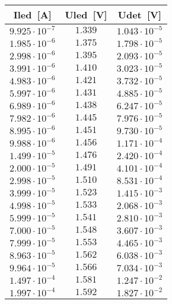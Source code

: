 
\begin{tabular}{|c|c|c|}
    \hline
    Iled~[A]	            & Uled~[V]	& Udet~[V]	 	            \\ \hline
    \(9.925\cdot10^{-7}\)	& \(1.339\)	& \(1.043\cdot10^{-5}\)	 	\\ \hline
    \(1.985\cdot10^{-6}\)	& \(1.375\)	& \(1.798\cdot10^{-5}\)	 	\\ \hline
    \(2.998\cdot10^{-6}\)	& \(1.395\)	& \(2.093\cdot10^{-5}\)	 	\\ \hline
    \(3.991\cdot10^{-6}\)	& \(1.410\)	& \(3.023\cdot10^{-5}\)	 	\\ \hline
    \(4.983\cdot10^{-6}\)	& \(1.421\)	& \(3.732\cdot10^{-5}\)	 	\\ \hline
    \(5.997\cdot10^{-6}\)	& \(1.431\)	& \(4.885\cdot10^{-5}\)	 	\\ \hline
    \(6.989\cdot10^{-6}\)	& \(1.438\)	& \(6.247\cdot10^{-5}\)	 	\\ \hline
    \(7.982\cdot10^{-6}\)	& \(1.445\)	& \(7.976\cdot10^{-5}\)	 	\\ \hline
    \(8.995\cdot10^{-6}\)	& \(1.451\)	& \(9.730\cdot10^{-5}\)	 	\\ \hline
    \(9.988\cdot10^{-6}\)	& \(1.456\)	& \(1.171\cdot10^{-4}\)	 	\\ \hline
    \(1.499\cdot10^{-5}\)	& \(1.476\)	& \(2.420\cdot10^{-4}\)	 	\\ \hline
    \(2.000\cdot10^{-5}\)	& \(1.491\)	& \(4.101\cdot10^{-4}\)	 	\\ \hline
    \(2.998\cdot10^{-5}\)	& \(1.510\)	& \(8.531\cdot10^{-4}\)	 	\\ \hline
    \(3.999\cdot10^{-5}\)	& \(1.523\)	& \(1.415\cdot10^{-3}\)	 	\\ \hline
    \(4.998\cdot10^{-5}\)	& \(1.533\)	& \(2.068\cdot10^{-3}\)	 	\\ \hline
    \(5.999\cdot10^{-5}\)	& \(1.541\)	& \(2.810\cdot10^{-3}\)	 	\\ \hline
    \(7.000\cdot10^{-5}\)	& \(1.548\)	& \(3.607\cdot10^{-3}\)	 	\\ \hline
    \(7.999\cdot10^{-5}\)	& \(1.553\)	& \(4.465\cdot10^{-3}\)	 	\\ \hline
    \(8.963\cdot10^{-5}\)	& \(1.562\)	& \(6.038\cdot10^{-3}\)	 	\\ \hline
    \(9.964\cdot10^{-5}\)	& \(1.566\)	& \(7.034\cdot10^{-3}\)	 	\\ \hline
    \(1.497\cdot10^{-4}\)	& \(1.581\)	& \(1.247\cdot10^{-2}\)	 	\\ \hline
    \(1.997\cdot10^{-4}\)	& \(1.592\)	& \(1.827\cdot10^{-2}\)	 	\\ \hline

\end{tabular}
